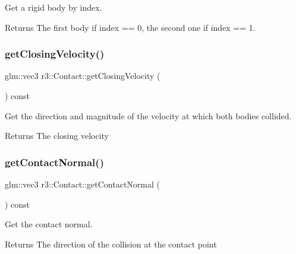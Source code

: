 Get a rigid body by index. \begin{DoxyReturn}{Returns}
The first body if index == 0, the second one if index == 1. 
\end{DoxyReturn}
\mbox{\label{classr3_1_1_contact_a4c02edbc7514fbc84cd1b7d70797619c}} 
\subsubsection{\texorpdfstring{get\+Closing\+Velocity()}{getClosingVelocity()}}
{\footnotesize\ttfamily glm\+::vec3 r3\+::\+Contact\+::get\+Closing\+Velocity (\begin{DoxyParamCaption}{ }\end{DoxyParamCaption}) const}



Get the direction and magnitude of the velocity at which both bodies collided. 

\begin{DoxyReturn}{Returns}
The closing velocity 
\end{DoxyReturn}
\mbox{\label{classr3_1_1_contact_a2d8f594947a1900fd21e2f707384d9fe}} 
\subsubsection{\texorpdfstring{get\+Contact\+Normal()}{getContactNormal()}}
{\footnotesize\ttfamily glm\+::vec3 r3\+::\+Contact\+::get\+Contact\+Normal (\begin{DoxyParamCaption}{ }\end{DoxyParamCaption}) const}



Get the contact normal. 

\begin{DoxyReturn}{Returns}
The direction of the collision at the contact point 
\end{DoxyReturn}
\mbox{\label{classr3_1_1_contact_a9558ff3dd4e2c5331fc05076e4e503a0}} 

